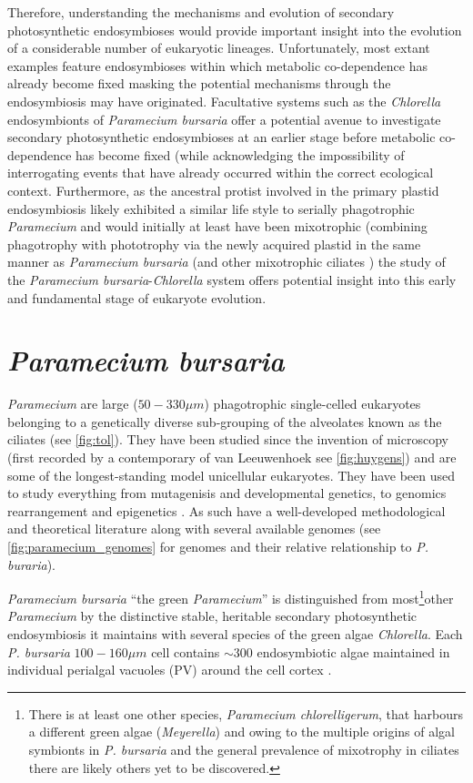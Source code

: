Therefore, understanding the mechanisms and evolution of secondary photosynthetic endosymbioses would provide important insight into the evolution of a considerable number of eukaryotic lineages.  Unfortunately, most extant examples feature endosymbioses within which metabolic co-dependence has already become fixed
masking the potential mechanisms through the endosymbiosis may have originated.  
Facultative systems such as the \textit{Chlorella} endosymbionts of \textit{Paramecium bursaria} offer a potential avenue to investigate secondary 
photosynthetic endosymbioses at an earlier stage before metabolic co-dependence has become fixed (while acknowledging the impossibility of 
interrogating events that have already occurred within the correct ecological context.
Furthermore, as the ancestral protist involved in the primary plastid endosymbiosis likely exhibited a similar life style to serially phagotrophic
\textit{Paramecium} and would initially at least have been mixotrophic (combining phagotrophy with phototrophy via the newly acquired plastid \citep{Rockwell2014} in the same manner as \textit{Paramecium bursaria} (and other mixotrophic ciliates \citep{Johnson2011}) the study of the \textit{Paramecium bursaria}-\textit{Chlorella} system offers potential insight into this early and fundamental stage of eukaryote evolution.

\section{\textit{Paramecium bursaria}}
\textit{Paramecium} are large (\(50-330\mu m\)) phagotrophic single-celled eukaryotes belonging %
to a genetically diverse \citep{Prescott1994} sub-grouping of the alveolates known as the ciliates (see \ref{fig:tol}).
They have been studied since the invention of microscopy \citep{Gortz2009} (first recorded by a contemporary of van Leeuwenhoek 
see \ref{fig:huygens}) and are some of the longest-standing model unicellular eukaryotes.  They have been used
to study everything from mutagenisis and developmental genetics, to genomics rearrangement and epigenetics \citep{McGrath2014}. 
As such have a well-developed methodological \citep{Sonneborn1970} and theoretical literature along with 
several available genomes (see \ref{fig:paramecium_genomes} for genomes and their relative relationship to \textit{P. buraria}). %

\textit{Paramecium bursaria} ``the green \textit{Paramecium}'' is distinguished from most\footnote{
    There is at least one other species, \textit{Paramecium chlorelligerum}, that harbours a different green algae (\textit{Meyerella}) \citep{Kreutz2012}
    and owing to the multiple origins of algal symbionts in \textit{P. bursaria} \citep{Hoshina2009} and the general prevalence of mixotrophy
    in ciliates \citep{Johnson2011} there are likely others yet to be discovered.
}other \textit{Paramecium} by the distinctive stable, heritable secondary photosynthetic endosymbiosis it maintains with several species of 
the green algae \textit{Chlorella}.  
Each \textit{P. bursaria} \(100-160\mu m\) \citep{Jennings1939} cell contains \(\sim 300\) endosymbiotic algae maintained in individual perialgal vacuoles (PV) around the cell cortex \citep{Hoshina2009}.

